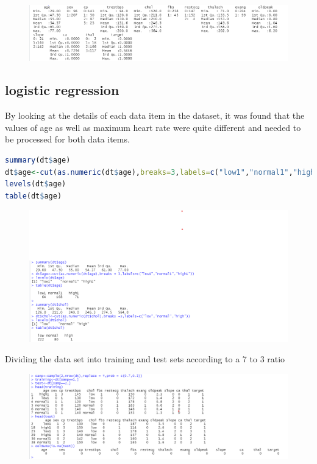 \documentclass{article}
\begin{document}
  \begin{figure}[H]
    \centering
    \includegraphics[width=1\textwidth]{task1_1_dtSummary.png}
  \end{figure}

\subsection{logistic regression}
By looking at the details of each data item in the dataset, it was found that the values of age as well as maximum heart rate were quite different and needed to be processed for both data items.
\begin{lstlisting}[language=R]
summary(dt$age)
dt$age<-cut(as.numeric(dt$age),breaks=3,labels=c("low1","normal1","high1"))
levels(dt$age)
table(dt$age)
\end{lstlisting}
\begin{figure}[H]
  \centering
  \includegraphics[width=1\textwidth]{task1_1_ageSummary.png}
\end{figure}
Dividing the data set into training and test sets according to a 7 to 3 ratio
\begin{figure}[H]
  \centering
  \includegraphics[width=1\textwidth]{task1_1_dataDivide.png}
\end{figure}
\end{document}
